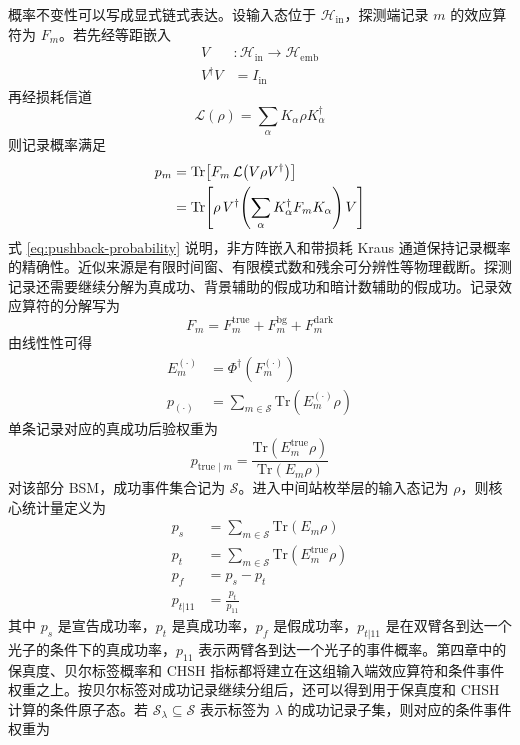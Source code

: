 概率不变性可以写成显式链式表达。设输入态位于 $\mathcal{H}_{\mathrm{in}}$，探测端记录 $m$ 的效应算符为 $F_m$。若先经等距嵌入
\begin{align}
V&:\mathcal{H}_{\mathrm{in}}\rightarrow \mathcal{H}_{\mathrm{emb}}\\
V^\dagger V&=I_{\mathrm{in}}
\label{eq:isometry-embed}
\end{align}
再经损耗信道
\begin{equation}
\mathcal{L}(\rho)=\sum_{\alpha}K_\alpha \rho K_\alpha^\dagger
\label{eq:loss-kraus-rect}
\end{equation}
则记录概率满足
\begin{align}
p_m
&=\mathrm{Tr}\!\left[F_m\,\mathcal{L}\!\left(V\rho V^\dagger\right)\right]\notag\\
&=\mathrm{Tr}\!\left[\rho\,V^\dagger\!\left(\sum_{\alpha}K_\alpha^\dagger F_m K_\alpha\right)V\right]
\label{eq:pushback-probability}
\end{align}
式 \eqref{eq:pushback-probability} 说明，非方阵嵌入和带损耗 Kraus 通道保持记录概率的精确性。近似来源是有限时间窗、有限模式数和残余可分辨性等物理截断。探测记录还需要继续分解为真成功、背景辅助的假成功和暗计数辅助的假成功。记录效应算符的分解写为
\begin{equation}
F_m=F_m^{\mathrm{true}}+F_m^{\mathrm{bg}}+F_m^{\mathrm{dark}}
\label{eq:record-effect-decomp}
\end{equation}
由线性性可得
\begin{align}
E_m^{(\cdot)} &= \Phi^\dagger\!\left(F_m^{(\cdot)}\right)\\
p_{(\cdot)} &= \sum_{m\in\mathcal{S}}\mathrm{Tr}\!\left(E_m^{(\cdot)}\rho\right)
\label{eq:component-pushback}
\end{align}
单条记录对应的真成功后验权重为
\begin{equation}
p_{\mathrm{true}\mid m}
=
\frac{\mathrm{Tr}\!\left(E_m^{\mathrm{true}}\rho\right)}
      {\mathrm{Tr}\!\left(E_m\rho\right)}
\label{eq:true-posterior-record}
\end{equation}
对该部分 BSM，成功事件集合记为 $\mathcal{S}$。进入中间站枚举层的输入态记为 $\rho$，则核心统计量定义为
\begin{align}
p_s &= \sum_{m\in\mathcal{S}} \mathrm{Tr}(E_m\rho)\\
p_t &= \sum_{m\in\mathcal{S}} \mathrm{Tr}(E_m^{\mathrm{true}}\rho)\\
p_f &= p_s-p_t\\
p_{t|11} &= \frac{p_t}{p_{11}}
\label{eq:core-metrics-ch3}
\end{align}
其中 $p_s$ 是宣告成功率，$p_t$ 是真成功率，$p_f$ 是假成功率，$p_{t|11}$ 是在双臂各到达一个光子的条件下的真成功率，$p_{11}$ 表示两臂各到达一个光子的事件概率。第四章中的保真度、贝尔标签概率和 CHSH 指标都将建立在这组输入端效应算符和条件事件权重之上。按贝尔标签对成功记录继续分组后，还可以得到用于保真度和 CHSH 计算的条件原子态。若 $\mathcal{S}_\lambda\subseteq\mathcal{S}$ 表示标签为 $\lambda$ 的成功记录子集，则对应的条件事件权重为
